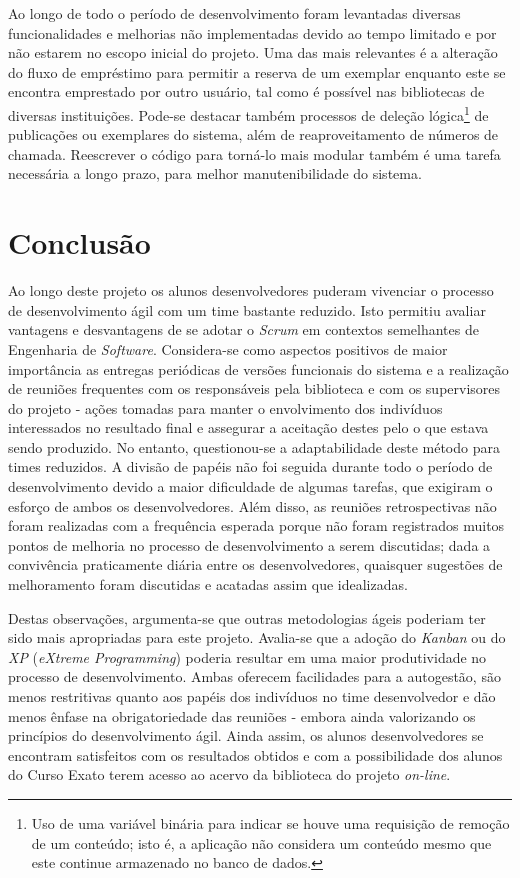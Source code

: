\documentclass[a4paper]{article}
\begin{document}
Ao longo de todo o período de desenvolvimento foram levantadas diversas funcionalidades e melhorias não implementadas devido ao tempo limitado e por não estarem no escopo inicial do projeto. Uma das mais relevantes é a alteração do fluxo de empréstimo para permitir a reserva de um exemplar enquanto este se encontra emprestado por outro usuário, tal como é possível nas bibliotecas de diversas instituições. Pode-se destacar também processos de deleção lógica\footnote{Uso de uma variável binária para indicar se houve uma requisição de remoção de um conteúdo; isto é, a aplicação não considera um conteúdo mesmo que este continue armazenado no banco de dados.} de publicações ou exemplares do sistema, além de reaproveitamento de números de chamada. Reescrever o código para torná-lo mais modular também é uma tarefa necessária a longo prazo, para melhor manutenibilidade do sistema.

\section{Conclusão}
Ao longo deste projeto os alunos desenvolvedores puderam vivenciar o processo de desenvolvimento ágil com um time bastante reduzido. Isto permitiu avaliar vantagens e desvantagens de se adotar o \textit{Scrum} em contextos semelhantes de Engenharia de \textit{Software}. Considera-se como aspectos positivos de maior importância as entregas periódicas de versões funcionais do sistema e a realização de reuniões frequentes com os responsáveis pela biblioteca e com os supervisores do projeto - ações tomadas para manter o envolvimento dos indivíduos interessados no resultado final e assegurar a aceitação destes pelo o que estava sendo produzido. No entanto, questionou-se a adaptabilidade deste método para times reduzidos. A divisão de papéis não foi seguida durante todo o período de desenvolvimento devido a maior dificuldade de algumas tarefas, que exigiram o esforço de ambos os desenvolvedores. Além disso, as reuniões retrospectivas não foram realizadas com a frequência esperada porque não foram registrados muitos pontos de melhoria no processo de desenvolvimento a serem discutidas; dada a convivência praticamente diária entre os desenvolvedores, quaisquer sugestões de melhoramento foram discutidas e acatadas assim que idealizadas.

Destas observações, argumenta-se que outras metodologias ágeis poderiam ter sido mais apropriadas para este projeto. Avalia-se que a adoção do \textit{Kanban} \cite{kanban} ou do \textit{XP} (\textit{eXtreme Programming}) \cite{xp} poderia resultar em uma maior produtividade no processo de desenvolvimento. Ambas oferecem facilidades para a autogestão, são menos restritivas quanto aos papéis dos indivíduos no time desenvolvedor e dão menos ênfase na obrigatoriedade das reuniões - embora ainda valorizando os princípios do desenvolvimento ágil. Ainda assim, os alunos desenvolvedores se encontram satisfeitos com os resultados obtidos e com a possibilidade dos alunos do Curso Exato terem acesso ao acervo da biblioteca do projeto \textit{on-line}.
\end{document}

